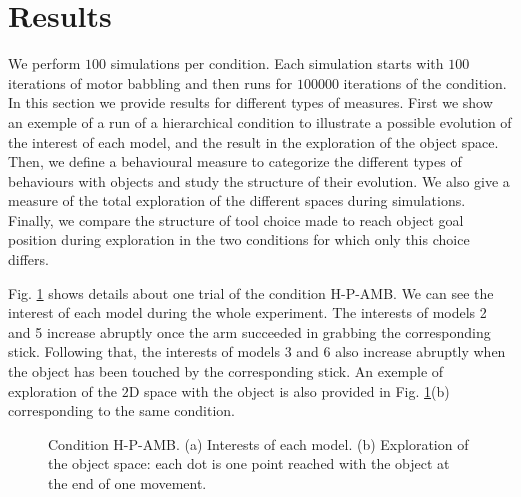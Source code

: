 \documentclass[10pt,letterpaper]{article}
\begin{document}
	
%


\section{Results}
	
	We perform $100$ simulations per condition. 
	Each simulation starts with $100$ iterations of motor babbling and then runs for $100000$ iterations of the condition.
	In this section we provide results for different types of measures. 
	First we show an exemple of a run of a hierarchical condition to illustrate a possible evolution of the interest of each model, and the result in the exploration of the object space.
	Then, we define a behavioural measure to categorize the different types of behaviours with objects and study the structure of their evolution.
	We also give a measure of the total exploration of the different spaces during simulations.
	Finally, we compare the structure of tool choice made to reach object goal position during exploration in the two conditions for which only this choice differs.
		
	Fig. \ref{res_interests} shows details about one trial of the condition H-P-AMB. 
	We can see the interest of each model during the whole experiment.
	The interests of models 2 and 5 increase abruptly once the arm succeeded in grabbing the corresponding stick.
	Following that, the interests of models 3 and 6 also increase abruptly when the object has been touched by the corresponding stick.
	An exemple of exploration of the $2$D space with the object is also provided in Fig. \ref{res_interests}(b) corresponding to the same condition.
	
	\begin{figure}[ht]
		\centering
		\caption{Condition H-P-AMB. (a) Interests of each model. (b) Exploration of the object space: each dot is one point reached with the object at the end of one movement.}
		\label{res_interests}
	\end{figure}
\end{document}
